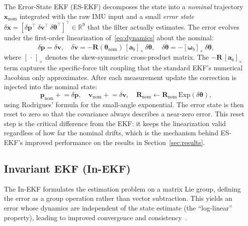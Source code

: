 \documentclass[conference]{IEEEtran}
\begin{document}
The Error-State EKF (ES-EKF) decomposes the state into a \emph{nominal} trajectory $\mathbf{x}_{\text{nom}}$ integrated with the raw IMU input and a small \emph{error state} $\delta\mathbf{x} = [\delta\mathbf{p}^\top\ \delta\mathbf{v}^\top\ \delta\boldsymbol{\theta}^\top]^\top \in \mathbb{R}^9$ that the filter actually estimates. The error evolves under the first-order linearization of~\eqref{eq:dynamics} about the nominal:
\begin{equation}
  \delta\dot{\mathbf{p}} = \delta\mathbf{v}, \quad
  \delta\dot{\mathbf{v}} = -\mathbf{R}(\boldsymbol{\theta}_{\text{nom}})\,[\mathbf{a}_b]_\times\,\delta\boldsymbol{\theta}, \quad
  \delta\dot{\boldsymbol{\theta}} = -[\boldsymbol{\omega}_b]_\times\,\delta\boldsymbol{\theta},
  \label{eq:eserror}
\end{equation}
where $[\,\cdot\,]_\times$ denotes the skew-symmetric cross-product matrix. The $-\mathbf{R}\,[\mathbf{a}_b]_\times$ term captures the specific-force tilt coupling that the standard EKF's numerical Jacobian only approximates. After each measurement update the correction is injected into the nominal state:
\begin{equation}
  \mathbf{p}_{\text{nom}} \mathrel{+}= \delta\mathbf{p}, \quad
  \mathbf{v}_{\text{nom}} \mathrel{+}= \delta\mathbf{v}, \quad
  \mathbf{R}_{\text{nom}} \mathrel{\leftarrow} \mathbf{R}_{\text{nom}}\,\mathrm{Exp}(\delta\boldsymbol{\theta}),
\end{equation}
using Rodrigues' formula for the small-angle exponential. The error state is then reset to zero so that the covariance always describes a near-zero error. This reset step is the critical difference from the EKF: it keeps the linearization valid regardless of how far the nominal drifts, which is the mechanism behind ES-EKF's improved performance on the results in Section~\ref{sec:results}.

\subsection{Invariant EKF (In-EKF)}


The In-EKF formulates the estimation problem on a matrix Lie group, defining the error as a group operation rather than vector subtraction. This yields an error whose dynamics are independent of the state estimate (the ``log-linear'' property), leading to improved convergence and consistency~\cite{barrau2017invariant}.
\end{document}
